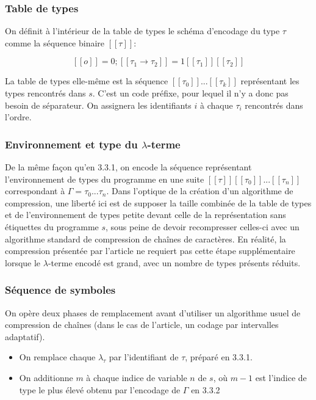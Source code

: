 \documentclass[titlepage]{article}
\providecommand{\tightlist}{%
  \setlength{\itemsep}{0pt}\setlength{\parskip}{0pt}}
\begin{document}
\subsubsection{Table de types}\label{table-de-types}

On définit à l'intérieur de la table de types le schéma d'encodage du
type \(\tau\) comme la séquence binaire \([\![\tau]\!]\):

\[[\![o]\!] = 0; [\![\tau_1 \rightarrow \tau_2]\!] = 1[\![\tau_1]\!][\![\tau_2]\!]\]

La table de types elle-même est la séquence
\([\![\tau_0]\!]...[\![\tau_{k}]\!]\) représentant les types rencontrés
dans \(s\). C'est un code préfixe, pour lequel il n'y a donc pas besoin
de séparateur. On assignera les identifiants \(i\) à chaque \(\tau_i\)
rencontrés dans l'ordre.

\subsubsection{\texorpdfstring{Environnement et type du
\(\lambda\)-terme}{Environnement et type du \textbackslash{}lambda-terme}}\label{environnement-et-type-du-lambda-terme}

De la même façon qu'en 3.3.1, on encode la séquence représentant
l'environnement de types du programme en une suite
\([\![\tau]\!][\![\tau_0]\!]...[\![\tau_{n}]\!]\) correspondant à
\(\Gamma = \tau_0...\tau_n\). Dans l'optique de la création d'un
algorithme de compression, une liberté ici est de supposer la taille
combinée de la table de types et de l'environnement de types petite
devant celle de la représentation sans étiquettes du programme \(s\),
sous peine de devoir recompresser celles-ci avec un algorithme standard
de compression de chaînes de caractères. En réalité, la compression
présentée par l'article ne requiert pas cette étape supplémentaire
lorsque le \(\lambda\)-terme encodé est grand, avec un nombre de types
présents réduits.

\subsubsection{Séquence de symboles}\label{suxe9quence-de-symboles}

On opère deux phases de remplacement avant d'utiliser un algorithme
usuel de compression de chaînes (dans le cas de l'article, un codage par
intervalles adaptatif).

\begin{itemize}
\tightlist
\item
  On remplace chaque \(\lambda_\tau\) par l'identifiant de \(\tau\),
  préparé en 3.3.1.
\item
  On additionne \(m\) à chaque indice de variable \(n\) de \(s\), où
  \(m-1\) est l'indice de type le plus élevé obtenu par l'encodage de
  \(\Gamma\) en 3.3.2
\end{itemize}
\end{document}
